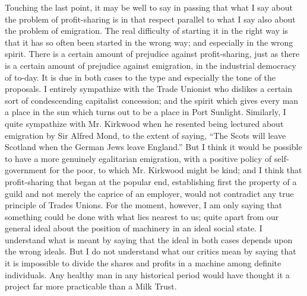 \documentclass{book}
\begin{document}
Touching the last point, it may be well to say in passing that what I say about the problem of profit-sharing is in that respect parallel to what I say also about the problem of emigration. The real difficulty of starting it in the right way is that it has so often been started in the wrong way; and especially in the wrong spirit. There is a certain amount of prejudice against profit-sharing, just as there is a certain amount of prejudice against emigration, in the industrial democracy of to-day. It is due in both cases to the type and especially the tone of the proposals. I entirely sympathize with the Trade Unionist who dislikes a certain sort of condescending capitalist concession; and the spirit which gives every man a place in the sun which turns out to be a place in Port Sunlight. Similarly, I quite sympathize with Mr. Kirkwood when he resented being lectured about emigration by Sir Alfred Mond, to the extent of saying, “The Scots will leave Scotland when the German Jews leave England.” But I think it would be possible to have a more genuinely egalitarian emigration, with a positive policy of self-government for the poor, to which Mr. Kirkwood might be kind; and I think that profit-sharing that began at the popular end, establishing first the property of a guild and not merely the caprice of an employer, would not contradict any true principle of Trades Unions. For the moment, however, I am only saying that something could be done with what lies nearest to us; quite apart from our general ideal about the position of machinery in an ideal social state. I understand what is meant by saying that the ideal in both cases depends upon the wrong ideals. But I do not understand what our critics mean by saying that it is impossible to divide the shares and profits in a machine among definite individuals. Any healthy man in any historical period would have thought it a project far more practicable than a Milk Trust.
\end{document}
